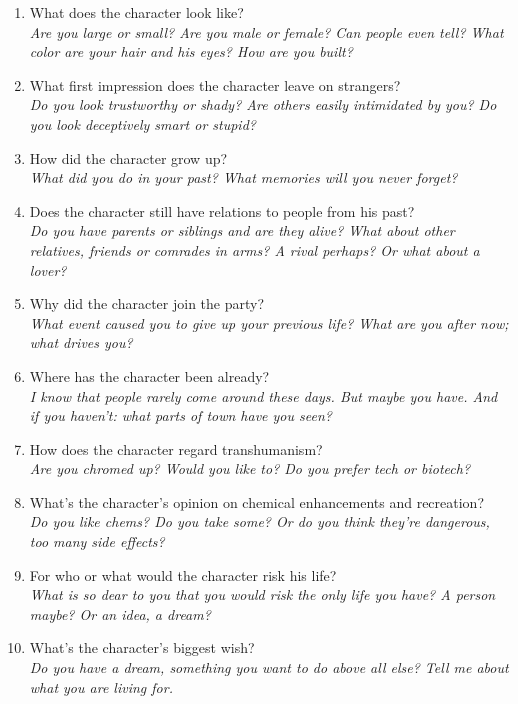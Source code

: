 \documentclass[12pt,a4paper,openany,usenames,dvipsnames]{book}
\begin{document}
	\begin{enumerate}
		\setlength\itemsep{-6mm}
		\item What does the character look like?\\
			\textit{Are you large or small? Are you male or female? Can people even tell? What color are your hair and his eyes? How are you built?}
		\item What first impression does the character leave on strangers?\\
			\textit{Do you look trustworthy or shady? Are others easily intimidated by you? Do you look deceptively smart or stupid?}
		\item How did the character grow up?\\
			\textit{What did you do in your past? What memories will you never forget?}
		\item Does the character still have relations to people from his past?\\
			\textit{Do you have parents or siblings and are they alive? What about other relatives, friends or comrades in arms? A rival perhaps? Or what about a lover?}
		\item Why did the character join the party?\\
			\textit{What event caused you to give up your previous life? What are you after now; what drives you?}
		\item Where has the character been already?\\
			\textit{I know that people rarely come around these days. But maybe you have. And if you haven't: what parts of town have you seen?}
		\item How does the character regard transhumanism?\\
			\textit{Are you chromed up? Would you like to? Do you prefer tech or biotech?}
		\item What’s the character’s opinion on chemical enhancements and recreation?\\
			\textit{Do you like chems? Do you take some? Or do you think they're dangerous, too many side effects?}
		\item For who or what would the character risk his life?\\
			\textit{What is so dear to you that you would risk the only life you have? A person maybe? Or an idea, a dream?}
		\item What’s the character’s biggest wish?\\
			\textit{Do you have a dream, something you want to do above all else? Tell me about what you are living for.}

\end{enumerate}
\end{document}
